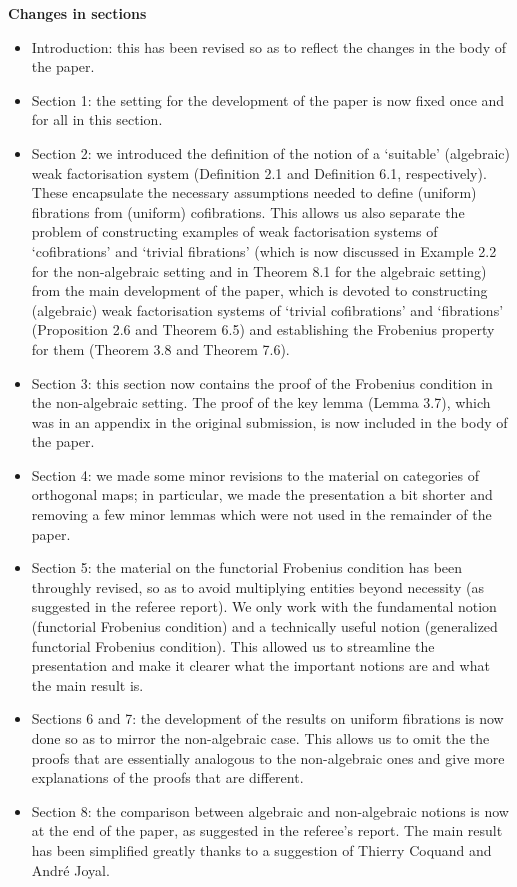 \documentclass[reqno,10pt,a4paper,oneside,draft]{amsart}
\begin{document}
{\bf Changes in sections} 
\begin{itemize}
\item Introduction: this has been revised so as to reflect the changes in the body of the paper.
\item Section 1: the setting for the development of the paper is now fixed once and for all in this section. 
\item Section 2: we introduced the definition of the notion of a `suitable' (algebraic) weak factorisation system (Definition 2.1 and Definition 6.1, respectively). These encapsulate the necessary 
assumptions needed to define (uniform) fibrations from (uniform) cofibrations. This allows us also separate the problem of constructing examples of weak factorisation systems
of `cofibrations' and `trivial fibrations' (which is now discussed  in Example 2.2 for the non-algebraic setting and in Theorem 8.1 for the algebraic setting) from the main development of the paper, which is devoted to constructing (algebraic) weak factorisation systems of
`trivial cofibrations' and `fibrations' (Proposition 2.6 and Theorem 6.5) and 
establishing the 
Frobenius property for them (Theorem 3.8 and Theorem 7.6).
\item Section 3: this section now contains the proof of the Frobenius condition in the non-algebraic setting. The proof of the key lemma (Lemma 3.7), which was in an appendix in the original submission,  is now included in the body of the paper.
\item Section 4: we made some minor revisions to the material on categories of orthogonal maps;
in particular, we made the presentation a bit shorter and removing a few minor 
lemmas which were not  used  in the remainder of the paper.
\item Section 5: the material on the functorial Frobenius condition  has been throughly revised, so as to avoid multiplying entities beyond necessity (as suggested in the referee report). We only work with the fundamental notion (functorial Frobenius condition) and a technically useful notion (generalized functorial Frobenius condition). This allowed us to streamline the presentation 
and make it clearer what the important notions are and what the main result is. 
\item Sections 6 and 7: the development of the results on uniform fibrations 
is now done so as to mirror the non-algebraic case. This allows us to omit the 
the proofs that are essentially analogous to the non-algebraic ones and 
give more explanations of the proofs that are different.
\item Section 8: the comparison between algebraic and non-algebraic notions is now at the end of the paper, as suggested in the referee's report. The main result has been simplified greatly thanks to a
suggestion of Thierry Coquand and Andr\'e Joyal. 
\end{itemize}
\end{document}
